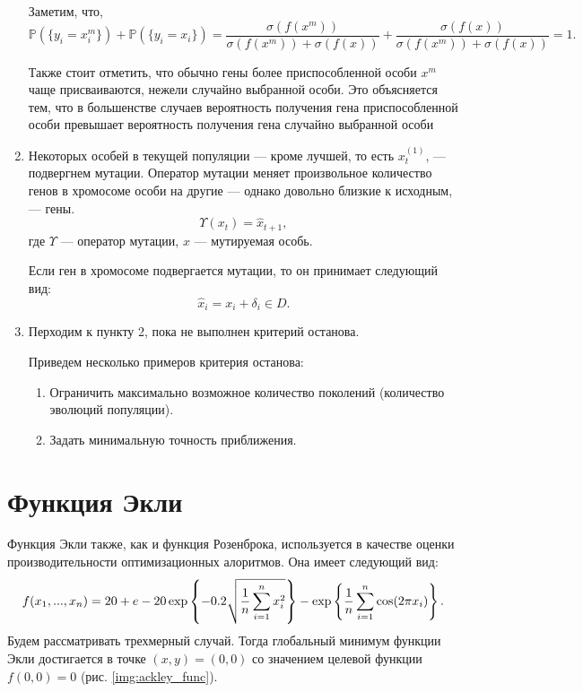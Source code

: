 \begin{enumerate}
Заметим, что,
\[
	\mathbb{P}(\{y_i = x^{m}_i\}) + \mathbb{P}(\{y_i = x_i\})
	=
	\dfrac{\sigma(f(x^{m}))}{\sigma(f(x^{m})) + \sigma(f(x))}
	+
	\dfrac{\sigma(f(x))}{\sigma(f(x^{m})) + \sigma(f(x))}
	=
	1.
\]

Также стоит отметить, что обычно гены более приспособленной особи $x^{m}$ чаще присваиваются, нежели случайно выбранной особи. Это объясняется тем, что в большенстве случаев вероятность получения гена приспособленной особи превышает вероятность получения гена случайно выбранной особи

\item Некоторых особей в текущей популяции --- кроме лучшей, то есть $x_t^{(1)}$, --- подвергнем мутации. Оператор мутации меняет произвольное количество генов в хромосоме особи на другие
 --- однако довольно близкие к исходным, --- гены.
\begin{equation}
	\label{eq:mutation}
	\Upsilon(x_t) = \hat{x}_{t+1},
\end{equation}
где $\Upsilon$ --- оператор мутации, $x$ --- мутируемая особь.

Если ген в хромосоме подвергается мутации, то он принимает следующий вид:
\[
\hat{x}_i
= x_i + \delta_i \in D.
\]

\item Перходим к пункту 2, пока не выполнен критерий останова.

	Приведем несколько примеров критерия останова:
	\begin{enumerate}
		\item Ограничить максимально возможное количество поколений (количество эволюций популяции).
		\item Задать минимальную точность приближения.
	\end{enumerate}
\end{enumerate}

\section{Функция Экли}
\noindent
Функция Экли также, как и функция Розенброка, используется в качестве оценки производительности оптимизационных алоритмов. Она имеет следующий вид:
 \[
 	f(x_1, ..., x_n)
	=
	20
	+
	e
	-20\exp\left\{-0.2
	\sqrt{\dfrac{1}{n}
	\sum_{i=1}^n \limits x^2_i}
	\right\}
	-
	\exp\left\{
	\dfrac{1}{n}
	\sum_{i=1}^n \limits
	\cos(2\pi x_i)
	\right\}.
 \]
 Будем рассматривать трехмерный случай. Тогда глобальный минимум функции Экли достигается в точке $(x, y) = (0, 0)$ со значением целевой функции $f(0, 0) = 0$ (рис. \ref{img:ackley_func}).

